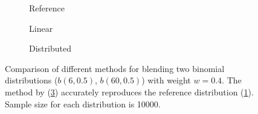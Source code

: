\begin{figure}[!ht]
    \centering
    \begin{subfigure}[b]{0.32\columnwidth}
        \resizebox{1\linewidth}{!}{}
        \vspace{-5pt}
        \caption{Reference\label{fig:blending-reference}}
    \end{subfigure}
    \begin{subfigure}[b]{0.32\columnwidth}
        \resizebox{1\linewidth}{!}{}
        \vspace{-5pt}
        \caption{Linear\label{fig:blending-linear}}
    \end{subfigure}
    \begin{subfigure}[b]{0.32\columnwidth}
        \resizebox{1\linewidth}{!}{}
        \vspace{-5pt}
        \caption{Distributed\label{fig:blending-distributed}}
    \end{subfigure}

    \vspace{-5pt}
    \caption{
        Comparison of different methods for blending two binomial distributions ($b(6, 0.5)$, $b(60, 0.5)$) with weight $w=0.4$. The method by \textcite{deliot2023} (\cref{fig:blending-distributed}) accurately reproduces the reference distribution (\cref{fig:blending-reference}). Sample size for each distribution is 10000.
        \label{fig:blending}
    }
\end{figure}